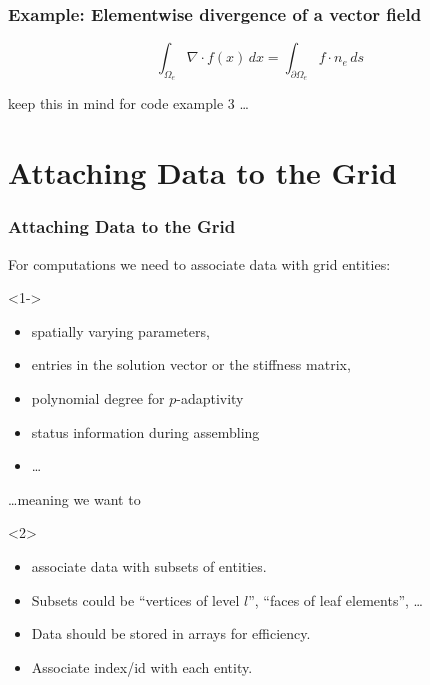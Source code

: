 \documentclass[aspectratio=169,11pt]{beamer}
\theoremstyle{definition}
\begin{document}
\begin{frame}[fragile] \frametitle{Example: Elementwise divergence of a vector field}
\begin{equation*}
\int_{\Omega_e} \nabla\cdot f(x) \,dx = \int_{\partial \Omega_e} f\cdot n_e \,ds
\end{equation*}
\bigskip
\begin{center}
\rightarrownice keep this in mind for code example 3 \ldots
\end{center}
\end{frame}

\section{Attaching Data to the Grid}

\begin{frame} \frametitle{Attaching Data to the Grid}

  For computations we need to associate data with grid entities:

  \begin{uncoverenv}<1->
  \begin{itemize}
  \item spatially varying parameters,
  \item entries in the solution vector or the stiffness matrix,
  \item polynomial degree for $p$-adaptivity
  \item status information during assembling
  \item \ldots
  \end{itemize}
  \end{uncoverenv}

  \pause
  \ldots meaning we want to
  
  \begin{uncoverenv}<2>
  \begin{itemize}
  \item associate data with subsets of entities.
  \item Subsets could be ``vertices of level $l$'', ``faces of leaf
    elements'', \ldots
  \item Data should be stored in arrays for efficiency.
  \item Associate index/id with each entity.
  \end{itemize}
  \end{uncoverenv}

\end{frame}
\end{document}
